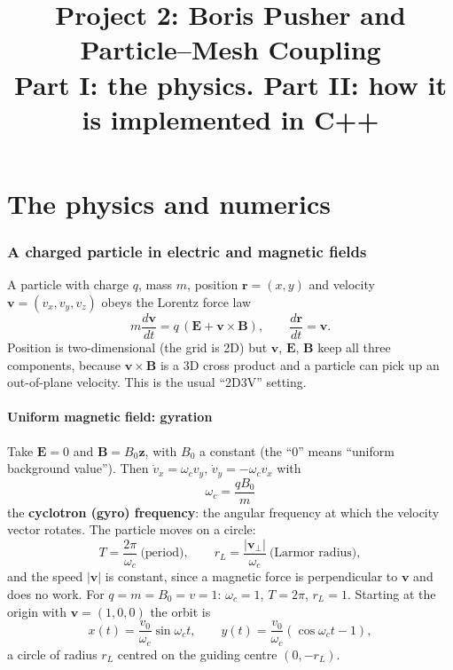 \documentclass[11pt,a4paper]{article}
\title{Project 2: Boris Pusher and Particle--Mesh Coupling\\[0.3em]
\large Part I: the physics. Part II: how it is implemented in C++}
\author{}
\date{}
\newcommand{\vv}{\mathbf{v}}
\newcommand{\EE}{\mathbf{E}}
\newcommand{\BB}{\mathbf{B}}
\begin{document}
\maketitle
\tableofcontents
\bigskip

\part{The physics and numerics}

\section{A charged particle in electric and magnetic fields}
\label{sec:lorentz}

A particle with charge $q$, mass $m$, position $\mathbf r=(x,y)$ and velocity
$\vv=(v_x,v_y,v_z)$ obeys the Lorentz force law
\begin{equation}
  m\frac{d\vv}{dt} = q\,(\EE + \vv\times\BB), \qquad \frac{d\mathbf r}{dt}=\vv .
  \label{eq:lorentz}
\end{equation}
Position is two-dimensional (the grid is 2D) but $\vv$, $\EE$, $\BB$ keep all three
components, because $\vv\times\BB$ is a 3D cross product and a particle can pick up
an out-of-plane velocity. This is the usual ``2D3V'' setting.

\subsection{Uniform magnetic field: gyration}
Take $\EE=0$ and $\BB=B_0\hat{\mathbf z}$, with $B_0$ a constant (the ``0'' means
``uniform background value''). Then $\dot v_x=\omega_c v_y$, $\dot v_y=-\omega_c v_x$ with
\begin{equation}
  \boxed{\omega_c=\frac{qB_0}{m}}
\end{equation}
the \textbf{cyclotron (gyro) frequency}: the angular frequency at which the velocity
vector rotates. The particle moves on a circle:
\begin{equation}
  T=\frac{2\pi}{\omega_c}\ \text{(period)},\qquad
  r_L=\frac{|\vv_\perp|}{\omega_c}\ \text{(Larmor radius)},
\end{equation}
and the speed $|\vv|$ is constant, since a magnetic force is perpendicular to $\vv$ and does no
work. For $q=m=B_0=v=1$: $\omega_c=1$, $T=2\pi$, $r_L=1$. Starting at the origin with
$\vv=(1,0,0)$ the orbit is
\[
  x(t)=\frac{v_0}{\omega_c}\sin\omega_c t,\qquad
  y(t)=\frac{v_0}{\omega_c}(\cos\omega_c t-1),
\]
a circle of radius $r_L$ centred on the guiding centre $(0,-r_L)$.
\end{document}
